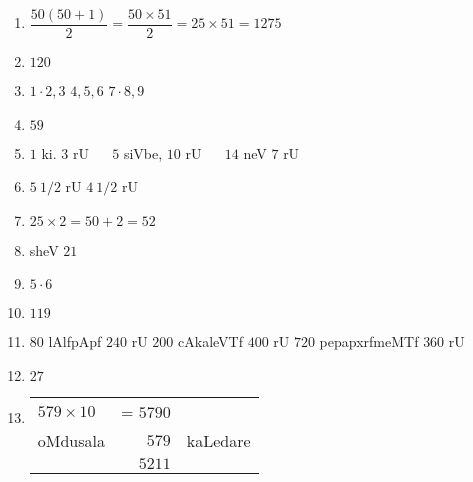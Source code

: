 \begin{enumerate}
\item $\dfrac{50(50+1)}{2} = \dfrac{50 \times 51}{2} = 25 \times 51 = 1275$
  
\item $120$

\item $1 \cdot 2, 3$ \qquad $4,5,6$ \qquad $7 \cdot 8,9$

\item $59$

\item $1$ ki. $3$ rU ~~ $5$ siVbe, $10$ rU ~~ $14$ neV $7$ rU

\item $5 ~ 1/2$ rU $4 ~ 1/2$ rU

\item $25 \times 2 = 50 +2 = 52$

\item sheV $21$

\item $5 \cdot 6$
  
\item $119$

\item $80$ lAlfpApf $240$ rU $200$ cAkaleVTf $400$ rU $720$  pepapxrfmeMTf $360$ rU

\item $27$

\item
  \qquad \begin{tabular}[t]{lrl}
    $579 \times 10$ & = $5790$ & \\
    oMdusala & $579$ & kaLedare \\\cline{2-2}
    & $5211$ &
  \end{tabular}

\end{enumerate}
